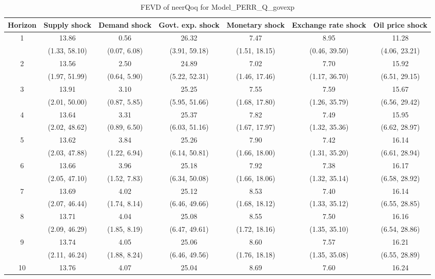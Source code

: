 \documentclass{article}
\begin{document}
\begin{table}
	\footnotesize
	\caption{FEVD of neerQoq for Model_PERR_Q_govexp}
	\begin{tabular}{ccccccc}
		Horizon & Supply shock & Demand shock & Govt. exp. shock & Monetary shock & Exchange rate shock & Oil price shock\\ \hline
		\multirow{2}{*}{1} & 13.86 & 0.56 & 26.32 & 7.47 & 8.95 & 11.28\\
		 & (1.33, 58.10) & (0.07, 6.08) & (3.91, 59.18) & (1.51, 18.15) & (0.46, 39.50) & (4.06, 23.21)\\
		\multirow{2}{*}{2} & 13.56 & 2.50 & 24.89 & 7.02 & 7.70 & 15.92\\
		 & (1.97, 51.99) & (0.64, 5.90) & (5.22, 52.31) & (1.46, 17.46) & (1.17, 36.70) & (6.51, 29.15)\\
		\multirow{2}{*}{3} & 13.91 & 3.10 & 25.25 & 7.55 & 7.59 & 15.67\\
		 & (2.01, 50.00) & (0.87, 5.85) & (5.95, 51.66) & (1.68, 17.80) & (1.26, 35.79) & (6.56, 29.42)\\
		\multirow{2}{*}{4} & 13.64 & 3.31 & 25.37 & 7.82 & 7.49 & 15.95\\
		 & (2.02, 48.62) & (0.89, 6.50) & (6.03, 51.16) & (1.67, 17.97) & (1.32, 35.36) & (6.62, 28.97)\\
		\multirow{2}{*}{5} & 13.62 & 3.84 & 25.26 & 7.90 & 7.42 & 16.14\\
		 & (2.03, 47.88) & (1.22, 6.94) & (6.14, 50.81) & (1.66, 18.00) & (1.31, 35.20) & (6.61, 28.94)\\
		\multirow{2}{*}{6} & 13.66 & 3.96 & 25.18 & 7.92 & 7.38 & 16.17\\
		 & (2.05, 47.10) & (1.52, 7.83) & (6.34, 50.08) & (1.66, 18.06) & (1.32, 35.14) & (6.58, 28.92)\\
		\multirow{2}{*}{7} & 13.69 & 4.02 & 25.12 & 8.53 & 7.40 & 16.14\\
		 & (2.07, 46.44) & (1.74, 8.14) & (6.46, 49.66) & (1.68, 18.12) & (1.33, 35.12) & (6.55, 28.85)\\
		\multirow{2}{*}{8} & 13.71 & 4.04 & 25.08 & 8.55 & 7.50 & 16.16\\
		 & (2.09, 46.29) & (1.85, 8.19) & (6.47, 49.61) & (1.72, 18.16) & (1.35, 35.10) & (6.54, 28.86)\\
		\multirow{2}{*}{9} & 13.74 & 4.05 & 25.06 & 8.60 & 7.57 & 16.21\\
		 & (2.11, 46.24) & (1.88, 8.24) & (6.46, 49.56) & (1.76, 18.18) & (1.35, 35.08) & (6.55, 28.89)\\
		\multirow{2}{*}{10} & 13.76 & 4.07 & 25.04 & 8.69 & 7.60 & 16.24\\

\end{tabular}
\end{table}
\end{document}
